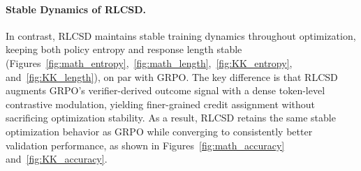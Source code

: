 \paragraph{Stable Dynamics of RLCSD.}
In contrast, RLCSD maintains stable training dynamics throughout optimization, keeping both policy entropy and response length stable (Figures~\ref{fig:math_entropy},~\ref{fig:math_length},~\ref{fig:KK_entropy}, and~\ref{fig:KK_length}), on par with GRPO. The key difference is that RLCSD augments GRPO's verifier-derived outcome signal with a dense token-level contrastive modulation, yielding finer-grained credit assignment without sacrificing optimization stability. As a result, RLCSD retains the same stable optimization behavior as GRPO while converging to consistently better validation performance, as shown in Figures~\ref{fig:math_accuracy} and~\ref{fig:KK_accuracy}.




